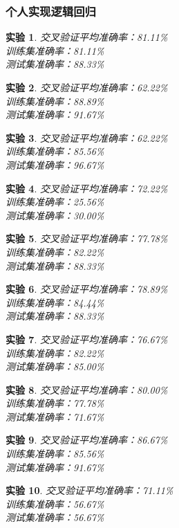 \documentclass[cn,hazy,blue,14pt,normal]{elegantnote}
\newtheorem{train}{实验}
\begin{document}
\subsubsection{个人实现逻辑回归}
\begin{train}交叉验证平均准确率：81.11\% \\  训练集准确率：81.11\% \\  测试集准确率：88.33\% \end{train}
\begin{train}交叉验证平均准确率：62.22\% \\  训练集准确率：88.89\% \\  测试集准确率：91.67\% \end{train}
\begin{train}交叉验证平均准确率：62.22\% \\  训练集准确率：85.56\% \\  测试集准确率：96.67\% \end{train}
\begin{train}交叉验证平均准确率：72.22\% \\  训练集准确率：25.56\% \\  测试集准确率：30.00\% \end{train}
\begin{train}交叉验证平均准确率：77.78\% \\  训练集准确率：82.22\% \\  测试集准确率：88.33\% \end{train}
\begin{train}交叉验证平均准确率：78.89\% \\  训练集准确率：84.44\% \\  测试集准确率：88.33\% \end{train}
\begin{train}交叉验证平均准确率：76.67\% \\  训练集准确率：82.22\% \\  测试集准确率：85.00\% \end{train}
\begin{train}交叉验证平均准确率：80.00\% \\  训练集准确率：77.78\% \\  测试集准确率：71.67\% \end{train}
\begin{train}交叉验证平均准确率：86.67\% \\  训练集准确率：85.56\% \\  测试集准确率：91.67\% \end{train}
\begin{train}交叉验证平均准确率：71.11\% \\  训练集准确率：56.67\% \\  测试集准确率：56.67\% \end{train}
\end{document}
